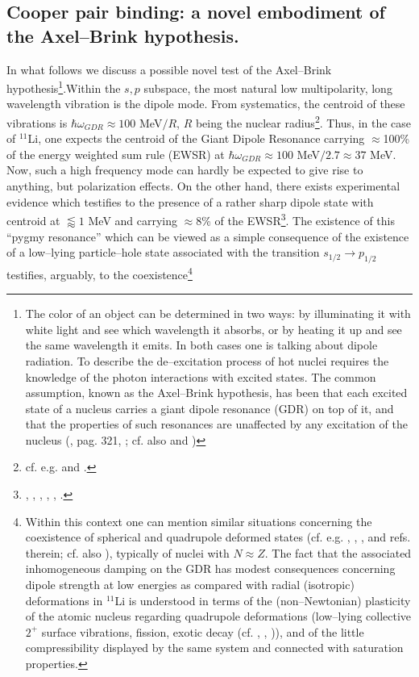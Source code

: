 \subsection{Cooper pair binding: a novel embodiment of the Axel--Brink hypothesis.}\label{sect1F1}
In what follows we discuss a possible novel test of the Axel--Brink hypothesis\footnote{The color of an object can be determined in two ways: by illuminating it with white light and see which wavelength it absorbs, or by heating it up and see the same wavelength it emits. In both cases one is talking about dipole radiation. To describe the de--excitation process of hot nuclei requires the knowledge of the photon interactions with excited states. The common assumption, known as the Axel--Brink hypothesis, has been that each excited state of a nucleus carries a giant dipole resonance (GDR) on top of it, and that the properties of such resonances are unaffected by any excitation of the nucleus (\cite{Brink:55}, \cite{Lynn:68} pag. 321, \cite{Axel:62}; cf. also \cite{Bertsch:86} and \cite{Bortignon:98})}.Within the $s,p$ subspace, the most natural low multipolarity, long wavelength vibration is the dipole mode. From systematics, the centroid of these vibrations is $\hbar \omega_{GDR}\approx 100$ MeV$/R$, $R$ being the nuclear radius\footnote{cf. e.g. \cite{Bortignon:98} and \cite{Bertsch:05}.}. Thus, in the case of $^{11}$Li, one expects the centroid of the Giant Dipole Resonance carrying $\approx$100\% of the energy weighted sum rule (EWSR) at $\hbar \omega_{GDR}\approx 100$ MeV$/2.7\approx 37$ MeV. Now, such a high frequency mode can hardly be expected to give rise to anything, but polarization effects. On the other hand, there exists experimental evidence which testifies to the presence of a rather sharp dipole state with centroid at $\lessapprox1$ MeV and carrying $\approx 8$\% of the EWSR\footnote{\cite{Zinser:97}, \cite{Nakamura:06}, \cite{Shimoura:95}, \cite{Ieki:93}, \cite{Sackett:93}, \cite{Kanungo:15,Kobayashi:89}.}. The existence of this ``pygmy resonance'' which can be viewed as a simple consequence of the existence of a low--lying particle--hole state associated with the transition $s_{1/2}\rightarrow p_{1/2}$ testifies, arguably, to the coexistence\footnote{Within this context one can mention similar situations concerning the coexistence of spherical and quadrupole deformed states (cf. e.g. \cite{Wimmer:10}, \cite{Federman:65}, \cite{Federman:66}, \cite{Donau:67} and refs. therein; cf. also \cite{Bohr:63}), typically of nuclei with $N\approx Z$. The fact that the associated inhomogeneous damping on the GDR has modest consequences concerning dipole strength at low energies as compared with radial (isotropic) deformations in $^{11}$Li is understood in terms of the (non--Newtonian) plasticity of the atomic nucleus regarding quadrupole deformations (low--lying collective $2^+$ surface vibrations, fission, exotic decay (cf. \cite{Barranco:88}, \cite{Barranco:89,Bertsch:88b}, \cite{Bertsch:87})), and of the little compressibility displayed by the same system and connected with saturation properties.} 
